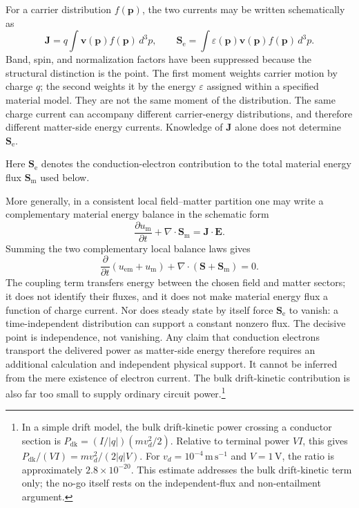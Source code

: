 \documentclass[12pt,onecolumn]{article}
\begin{document}
For a carrier distribution $f(\mathbf p)$, the two currents may be written schematically as
\[
\mathbf J
=q\int \mathbf v(\mathbf p)f(\mathbf p)\,d^3p,
\qquad
\mathbf S_{\mathrm e}
=\int \varepsilon(\mathbf p)\mathbf v(\mathbf p)f(\mathbf p)\,d^3p.
\]
Band, spin, and normalization factors have been suppressed because the structural distinction is the point. The first moment weights carrier motion by charge $q$; the second weights it by the energy $\varepsilon$ assigned within a specified material model. They are not the same moment of the distribution. The same charge current can accompany different carrier-energy distributions, and therefore different matter-side energy currents. Knowledge of $\mathbf J$ alone does not determine $\mathbf S_{\mathrm e}$.

Here $\mathbf S_{\mathrm e}$ denotes the conduction-electron contribution to the total material energy flux $\mathbf S_{\mathrm m}$ used below.

More generally, in a consistent local field--matter partition one may write a complementary material energy balance in the schematic form
\[
\frac{\partial u_{\mathrm m}}{\partial t}
+\nabla\cdot\mathbf S_{\mathrm m}
=\mathbf J\cdot\mathbf E.
\]
Summing the two complementary local balance laws gives
\[
\frac{\partial}{\partial t}
\left(u_{\mathrm{em}}+u_{\mathrm m}\right)
+\nabla\cdot
\left(\mathbf S+\mathbf S_{\mathrm m}\right)=0.
\]
The coupling term transfers energy between the chosen field and matter sectors; it does not identify their fluxes, and it does not make material energy flux a function of charge current. Nor does steady state by itself force $\mathbf S_{\mathrm e}$ to vanish: a time-independent distribution can support a constant nonzero flux. The decisive point is independence, not vanishing. Any claim that conduction electrons transport the delivered power as matter-side energy therefore requires an additional calculation and independent physical support. It cannot be inferred from the mere existence of electron current. The bulk drift-kinetic contribution is also far too small to supply ordinary circuit power.\footnote{In a simple drift model, the bulk drift-kinetic power crossing a conductor section is $P_{\mathrm{dk}}=(I/|q|)(m v_d^2/2)$. Relative to terminal power $VI$, this gives $P_{\mathrm{dk}}/(VI)=m v_d^2/(2|q|V)$. For $v_d=10^{-4}\,\mathrm{m\,s^{-1}}$ and $V=1\,\mathrm V$, the ratio is approximately $2.8\times10^{-20}$. This estimate addresses the bulk drift-kinetic term only; the no-go itself rests on the independent-flux and non-entailment argument.}
\end{document}
